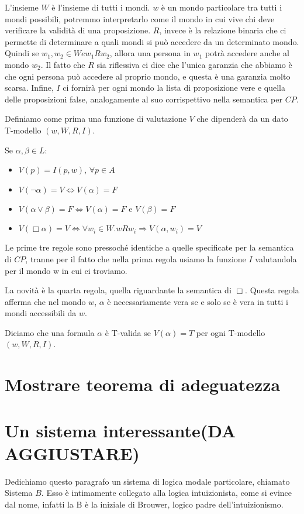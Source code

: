 \documentclass[a4paper, 12pt]{article}
\begin{document}
L'insieme $W$ è l'insieme di tutti i mondi.
$w$ è un mondo particolare tra tutti i mondi possibili, potremmo interpretarlo
come il mondo in cui vive chi deve verificare la validità di una proposizione.
$R$, invece è la relazione binaria
che ci permette di determinare a quali mondi si può accedere da un determinato mondo.
Quindi se $w_1, w_2 \in W e w_1 R w_2$, allora una persona in $w_1$ potrà accedere anche
al mondo $w_2$. Il fatto che $R$ sia riflessiva ci dice che l'unica garanzia che abbiamo
è che ogni persona può accedere al proprio mondo, e questa è una garanzia molto scarsa.
Infine, $I$ ci fornirà per ogni mondo la lista di proposizione vere
e quella delle proposizioni false, analogamente al suo corrispettivo nella semantica per $CP$.

Definiamo come prima una funzione di valutazione $V$ che dipenderà da un dato T-modello
$(w, W, R, I)$.

Se $\alpha, \beta \in L$:
\begin{itemize}
\item $V(p) = I(p, w)$, $\forall p \in A$
\item $V(\neg \alpha) = V \Leftrightarrow V(\alpha) = F$
\item $V(\alpha \vee \beta) = F \Leftrightarrow V(\alpha) = F$ e $V(\beta) = F$
\item $V(\Box \alpha) = V \Leftrightarrow \forall w_i \in W. w R w_i \Rightarrow V(\alpha, w_i) = V$
\end{itemize}

Le prime tre regole sono pressoché identiche a quelle specificate per la semantica di $CP$,
tranne per il fatto che nella prima regola usiamo la funzione $I$ valutandola per il mondo w
in cui ci troviamo.

La novità è la quarta regola, quella riguardante la semantica di $\Box$.
Questa regola afferma che nel mondo $w$, $\alpha$ è necessariamente vera se e solo se
è vera in tutti i mondi accessibili da $w$.

Diciamo che una formula $\alpha$ è T-valida se $V(\alpha) = T$ per ogni T-modello $(w, W, R, I)$.

\section{Mostrare teorema di adeguatezza}


\section{Un sistema interessante(DA AGGIUSTARE)}
Dedichiamo questo paragrafo un sistema di logica modale particolare, chiamato Sistema $B$.
Esso è intimamente collegato alla logica intuizionista, come si evince dal nome,
infatti la B è la iniziale di Brouwer, logico padre dell'intuizionismo.
\end{document}
